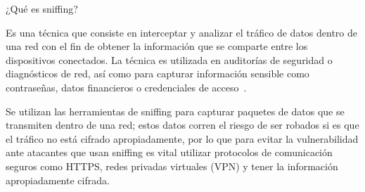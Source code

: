 ¿Qué es sniffing?
 
Es una técnica que consiste en interceptar y analizar el tráfico de datos dentro de una red con el fin de obtener la información que se comparte entre los dispositivos conectados. La técnica es utilizada en auditorías de seguridad o diagnósticos de red, así como para capturar información sensible como contraseñas, datos financieros o credenciales de acceso~\cite{snif}.
 
Se utilizan las herramientas de sniffing para capturar paquetes de datos que se transmiten dentro de una red; estos datos corren el riesgo de ser robados si es que el tráfico no está cifrado apropiadamente, por lo que para evitar la vulnerabilidad ante atacantes que usan sniffing es vital utilizar protocolos de comunicación seguros como HTTPS, redes privadas virtuales (VPN) y tener la información apropiadamente cifrada.
